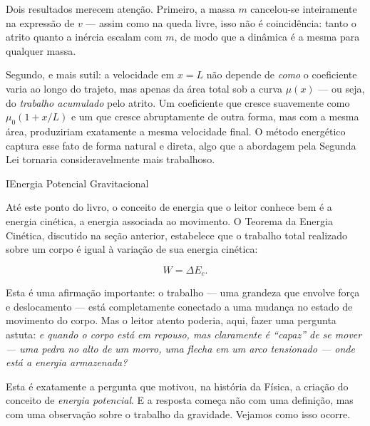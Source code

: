 \begin{exemplo}
Dois resultados merecem atenção. Primeiro, a massa $m$ cancelou-se
inteiramente na expressão de $v$ --- assim como na queda livre, isso
não é coincidência: tanto o atrito quanto a inércia escalam com $m$,
de modo que a dinâmica é a mesma para qualquer massa. 
\bigskip

Segundo, e mais sutil: a velocidade em $x = L$ não depende de \emph{como} o coeficiente
varia ao longo do trajeto, mas apenas da área total sob a curva
$\mu(x)$ --- ou seja, do \emph{trabalho acumulado} pelo atrito. Um
coeficiente que cresce suavemente como $\mu_0(1+x/L)$ e um que cresce
abruptamente de outra forma, mas com a mesma área, produziriam
exatamente a mesma velocidade final. O método energético captura esse
fato de forma natural e direta, algo que a abordagem pela Segunda Lei
tornaria consideravelmente mais trabalhoso.


\end{exemplo}









\begin{secnivel}{I}{Energia Potencial Gravitacional}
 

  
\end{secnivel}









Até este ponto do livro, o conceito de energia que o leitor conhece bem
é a energia cinética, a energia associada
ao movimento. O Teorema da Energia Cinética, discutido na seção anterior,
estabelece que o trabalho total realizado sobre um corpo é igual à
variação de sua energia cinética:

\[
  W = \Delta E_c.
\]

\noindent Esta é uma afirmação importante: o trabalho --- uma grandeza que
envolve força e deslocamento --- está completamente conectado a uma
mudança no estado de movimento do corpo. Mas o leitor atento poderia,
aqui, fazer uma pergunta astuta: \emph{e quando o corpo está em
repouso, mas claramente é ``capaz'' de se mover --- uma pedra no alto de
um morro, uma flecha em um arco tensionado --- onde está a energia
armazenada?}

Esta é exatamente a pergunta que motivou, na história da Física, a
criação do conceito de \textit{energia potencial}. E a resposta começa
não com uma definição, mas com uma observação sobre o trabalho da
gravidade. Vejamos como isso ocorre.


